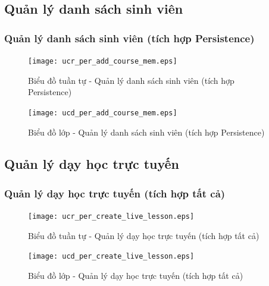 \documentclass[./../main.tex]{subfiles}
\begin{document}
\subsection{Quản lý danh sách sinh viên}
\subsubsection{Quản lý danh sách sinh viên (tích hợp Persistence)}
\begin{figure}[H]
    \centering
    \texttt{[image: ucr\_per\_add\_course\_mem.eps]}
    \caption{Biểu đồ tuần tự - Quản lý danh sách sinh viên (tích hợp Persistence)}
\end{figure}
\begin{figure}[H]
    \centering
    \texttt{[image: ucd\_per\_add\_course\_mem.eps]}
    \caption{Biểu đồ lớp - Quản lý danh sách sinh viên (tích hợp Persistence)}
\end{figure}

\subsection{Quản lý dạy học trực tuyến}
\subsubsection{Quản lý dạy học trực tuyến (tích hợp tất cả)}
\begin{figure}[H]
    \centering
    \texttt{[image: ucr\_per\_create\_live\_lesson.eps]}
    \caption{Biểu đồ tuần tự - Quản lý dạy học trực tuyến (tích hợp tất cả)}
\end{figure}
\begin{figure}[H]
    \centering
    \texttt{[image: ucd\_per\_create\_live\_lesson.eps]}
    \caption{Biểu đồ lớp - Quản lý dạy học trực tuyến (tích hợp tất cả)}
\end{figure}
\end{document}
